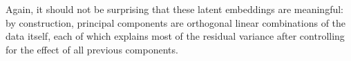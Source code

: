 \documentclass{article}
\theoremstyle{plain}
\theoremstyle{definition}
\theoremstyle{remark}
\begin{document}
Again, it should not be surprising that these latent embeddings are meaningful: by construction, principal components are orthogonal linear combinations of the data itself, each of which explains most of the residual variance after controlling for the effect of all previous components.










\end{document}
